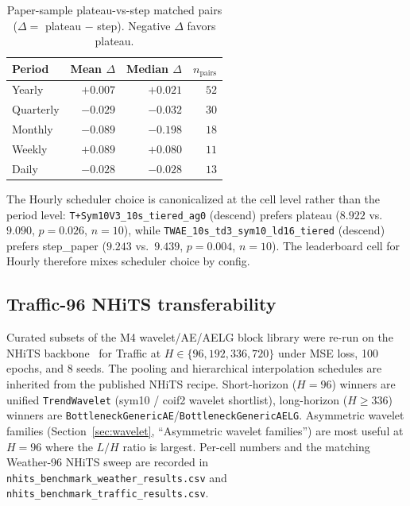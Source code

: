 \documentclass{article}
\begin{document}
\begin{table}[h]
\centering
\small
\caption{Paper-sample plateau-vs-step matched pairs ($\Delta = $ plateau $-$ step). Negative $\Delta$ favors plateau.}
\label{tab:lr_matched}
\begin{tabular}{@{}lrrr@{}}
\toprule
Period & Mean $\Delta$ & Median $\Delta$ & $n_\text{pairs}$ \\
\midrule
Yearly    & $+0.007$         & $+0.021$ & $52$ \\
Quarterly & $\mathbf{-0.029}$ & $-0.032$ & $30$ \\
Monthly   & $\mathbf{-0.089}$ & $-0.198$ & $18$ \\
Weekly    & $+0.089$         & $+0.080$ & $11$ \\
Daily     & $\mathbf{-0.028}$ & $-0.028$ & $13$ \\
\bottomrule
\end{tabular}
\end{table}

The Hourly scheduler choice is canonicalized at the cell level rather than the period level: \texttt{T+Sym10V3\_10s\_tiered\_ag0} (descend) prefers plateau ($8.922$ vs.\ $9.090$, $p=0.026$, $n=10$), while \texttt{TWAE\_10s\_td3\_sym10\_ld16\_tiered} (descend) prefers step\_paper ($9.243$ vs.\ $9.439$, $p=0.004$, $n=10$). The leaderboard cell for Hourly therefore mixes scheduler choice by config.

\subsection{Traffic-96 NHiTS transferability}
\label{app:ablations:nhits_traffic}

Curated subsets of the M4 wavelet/AE/AELG block library were re-run on the NHiTS backbone~\citep{challu2023nhits} for Traffic at $H \in \{96, 192, 336, 720\}$ under MSE loss, 100 epochs, and 8 seeds. The pooling and hierarchical interpolation schedules are inherited from the published NHiTS recipe. Short-horizon ($H=96$) winners are unified \texttt{TrendWavelet} (sym10 / coif2 wavelet shortlist), long-horizon ($H \geq 336$) winners are \texttt{BottleneckGenericAE}/\texttt{BottleneckGenericAELG}. Asymmetric wavelet families (Section~\ref{sec:wavelet}, ``Asymmetric wavelet families'') are most useful at $H=96$ where the $L/H$ ratio is largest. Per-cell numbers and the matching Weather-96 NHiTS sweep are recorded in \texttt{nhits\_benchmark\_weather\_results.csv} and \texttt{nhits\_benchmark\_traffic\_results.csv}.
\end{document}
